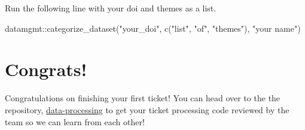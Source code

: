 \documentclass[
  letterpaper,
  DIV=11,
  numbers=noendperiod]{scrreprt}
\newenvironment{Shaded}{\begin{snugshade}}{\end{snugshade}}
\newcommand{\FunctionTok}[1]{\textcolor[rgb]{0.28,0.35,0.67}{#1}}
\newcommand{\NormalTok}[1]{\textcolor[rgb]{0.00,0.23,0.31}{#1}}
\newcommand{\SpecialCharTok}[1]{\textcolor[rgb]{0.37,0.37,0.37}{#1}}
\newcommand{\StringTok}[1]{\textcolor[rgb]{0.13,0.47,0.30}{#1}}
\begin{document}
Run the following line with your doi and themes as a list.

\begin{Shaded}
\begin{Highlighting}[]
\NormalTok{datamgmt}\SpecialCharTok{::}\FunctionTok{categorize\_dataset}\NormalTok{(}\StringTok{"your\_doi"}\NormalTok{, }\FunctionTok{c}\NormalTok{(}\StringTok{"list"}\NormalTok{, }\StringTok{"of"}\NormalTok{, }\StringTok{"themes"}\NormalTok{), }\StringTok{"your name"}\NormalTok{)}
\end{Highlighting}
\end{Shaded}

\hypertarget{congrats}{%
\section{Congrats!}\label{congrats}}

Congratulations on finishing your first ticket! You can head over to the
the repository,
\href{https://github.com/NCEAS/data-processing}{data-processing} to get
your ticket processing code reviewed by the team so we can learn from
each other!
\end{document}
